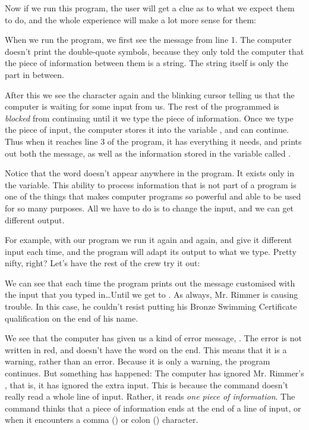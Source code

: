 \needspace{4cm}
Now if we run this program, the user will get a clue as to what we
expect them to do, and the whole experience will make a lot more sense
for them:


When we run the program, we first see the  message
from line 1.  The computer doesn't print the double-quote symbols,
because they only told the computer that the piece of information
between them is a string.  The string itself is only the part in
between.

After this we see the  character again and the blinking cursor
telling us that the computer is waiting for some input from us.  The
rest of the programmed is {\em blocked} from continuing until it we type the
piece of information.  Once we type the piece of input, the computer
stores it into the variable , and can continue.  Thus when it
reaches line 3 of the program, it has everything it needs, and
prints out both the  message, as well as the information
stored in the variable called .

Notice that the word  doesn't appear anywhere in the
program.  It exists only in the variable.  This ability to process
information that is not part of a program is one of the things that
makes computer programs so powerful and able to be used for so many
purposes. All we have to do is to change the input, and we can get
different output.


\needspace{4cm}
For example, with our program we run it again and again, and give it
different input each time, and the
program will adapt its output to what we type. Pretty nifty, right?
Let's have the rest of the crew try it out:


We can see that each time the program prints out the message
customised with the input that you typed in\ldots Until we get to
. As always, Mr. Rimmer is causing trouble.  In this
case, he couldn't resist putting his Bronze Swimming Certificate
qualification on the end of his name.

We see that the computer has
given us a kind of error message, .
The error is not written in red, and doesn't have the word 
on the end.  This means that it is a warning, rather than an error.
Because it is only a warning, the program continues.  But something
has happened: The computer has ignored Mr. Rimmer's , that
is, it has ignored the extra input.  This
is because the  command doesn't really read a whole line
of input. Rather, it reads {\em one piece of information}.  The
 command thinks that a piece of information ends at the end
of a line of input, or when it encounters a comma (\stw{,}) or colon
(\stw{:}) character.

